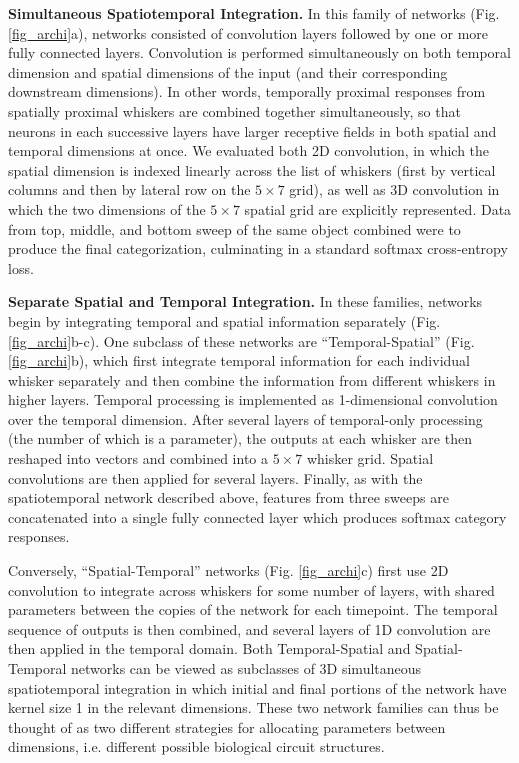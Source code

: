 \textbf{Simultaneous Spatiotemporal Integration.}
In this family of networks (Fig. \ref{fig_archi}a), networks consisted of convolution layers followed by one or more fully connected layers.  Convolution is performed simultaneously on both temporal dimension and spatial dimensions of the input (and their corresponding downstream dimensions). In other words, temporally proximal responses from spatially proximal whiskers are combined together simultaneously, so that neurons in each successive layers have larger receptive fields in both spatial and temporal dimensions at once.
We evaluated both 2D convolution, in which the spatial dimension is indexed linearly across the list of whiskers (first by vertical columns and then by lateral row on the $5\times7$ grid), as well as 3D convolution in which the two dimensions of the $5\times7$ spatial grid are explicitly represented.
Data from top, middle, and bottom sweep of the same object combined were to produce the final categorization, culminating in a standard softmax cross-entropy loss.  


\textbf{Separate Spatial and Temporal Integration.} In these families, networks begin by integrating temporal and spatial information separately (Fig. \ref{fig_archi}b-c).  
One subclass of these networks are ``Temporal-Spatial''  (Fig. \ref{fig_archi}b), which first integrate temporal information for each individual whisker separately and then combine the information from different whiskers in higher layers.
Temporal processing is implemented as 1-dimensional convolution over the temporal dimension. 
After several layers of temporal-only processing (the number of which is a parameter), the outputs at each whisker are then reshaped into vectors and combined into a $5\times7$ whisker grid.  Spatial convolutions are then applied for several layers. 
Finally, as with the spatiotemporal network described above, features from three sweeps are concatenated into a single fully connected layer which produces softmax category responses.

Conversely, ``Spatial-Temporal'' networks (Fig. \ref{fig_archi}c) first use 2D convolution to integrate across whiskers for some number of layers, with shared parameters between the copies of the network for each timepoint.  The temporal sequence of outputs is then combined, and several layers of 1D convolution are then applied in the temporal domain.  
Both Temporal-Spatial and Spatial-Temporal networks can be viewed as subclasses of 3D simultaneous spatiotemporal integration in which initial and final portions of the network have kernel size 1 in the relevant dimensions.  
These two network families can thus be thought of as two different strategies for allocating parameters between dimensions, i.e. different possible biological circuit structures.


